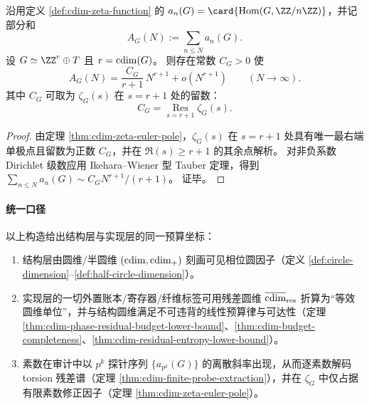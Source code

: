 \begin{theorem}\label{thm:cdim-zeta-tauber-asymptotic}
沿用定义 \ref{def:cdim-zeta-function} 的 \(a_n(G)=\card{\operatorname{Hom}(G,\ZZ/n\ZZ)}\)，并记部分和
\[
A_G(N):=\sum_{n\le N}a_n(G).
\]
设 \(G\simeq \ZZ^r\oplus T\) 且 \(r=\operatorname{cdim}(G)\)。
则存在常数 \(C_G>0\) 使
\[
A_G(N)=\frac{C_G}{r+1}\,N^{r+1}+o\!\left(N^{r+1}\right)\qquad(N\to\infty).
\]
其中 \(C_G\) 可取为 \(\zeta_G(s)\) 在 \(s=r+1\) 处的留数：
\[
C_G=\operatorname*{Res}_{s=r+1}\zeta_G(s).
\]
\end{theorem}
\begin{proof}
由定理 \ref{thm:cdim-zeta-euler-pole}，\(\zeta_G(s)\) 在 \(s=r+1\) 处具有唯一最右端单极点且留数为正数 \(C_G\)，并在 \(\Re(s)\ge r+1\) 的其余点解析。
对非负系数 Dirichlet 级数应用 Ikehara--Wiener 型 Tauber 定理，得到
\(
\sum_{n\le N}a_n(G)\sim C_G N^{r+1}/(r+1)
\)。
证毕。
\end{proof}

\paragraph{统一口径}
以上构造给出结构层与实现层的同一预算坐标：
\begin{enumerate}
  \item 结构层由圆维/半圆维 \((\operatorname{cdim},\operatorname{cdim}_+)\) 刻画可见相位圆因子（定义 \ref{def:circle-dimension}--\ref{def:half-circle-dimension}）。
  \item 实现层的一切外置账本/寄存器/纤维标签可用残差圆维 \(\overline{\operatorname{cdim}}_{\mathrm{res}}\) 折算为“等效圆维单位”，并与结构圆维满足不可违背的线性预算律与可达性（定理 \ref{thm:cdim-phase-residual-budget-lower-bound}、\ref{thm:cdim-budget-completeness}、\ref{thm:cdim-residual-entropy-lower-bound}）。
  \item 素数在审计中以 \(p^k\) 探针序列 \(\{a_{p^k}(G)\}\) 的离散斜率出现，从而逐素数解码 torsion 残差谱（定理 \ref{thm:cdim-finite-probe-extraction}），并在 \(\zeta_G\) 中仅占据有限素数修正因子（定理 \ref{thm:cdim-zeta-euler-pole}）。
\end{enumerate}

\endinput

